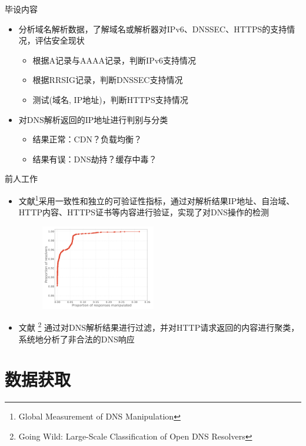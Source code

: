 \documentclass{beamer}
\begin{document}
\begin{frame}{毕设内容}
  \begin{itemize}
    \item 分析域名解析数据，了解域名或解析器对IPv6、DNSSEC、HTTPS的支持情况，评估安全现状
    \begin{itemize}
      \item 根据A记录与AAAA记录，判断IPv6支持情况  
      \item 根据RRSIG记录，判断DNSSEC支持情况
      \item 测试(域名, IP地址)，判断HTTPS支持情况
    \end{itemize}
    \item 对DNS解析返回的IP地址进行判别与分类
    \begin{itemize}
      \item 结果正常：CDN？负载均衡？
      \item 结果有误：DNS劫持？缓存中毒？
    \end{itemize}
  \end{itemize}
\end{frame}


\begin{frame}{前人工作}
  \begin{itemize}
    \item 文献\cite{Pearce2017}\footnote[1]{Global Measurement of DNS Manipulation}采用一致性和独立的可验证性指标，通过对解析结果IP地址、自治域、HTTP内容、HTTPS证书等内容进行验证，实现了对DNS操作的检测
    \begin{figure}
      \includegraphics[width=5cm]{images/dnsmanipulate.png}
      \end{figure}
    \item 文献 \cite{Kuhrer}\footnote[7]{Going Wild: Large-Scale Classification of Open DNS Resolvers} 通过对DNS解析结果进行过滤，并对HTTP请求返回的内容进行聚类，系统地分析了非合法的DNS响应
  \end{itemize}
\end{frame}


\section{数据获取}
\end{document}
